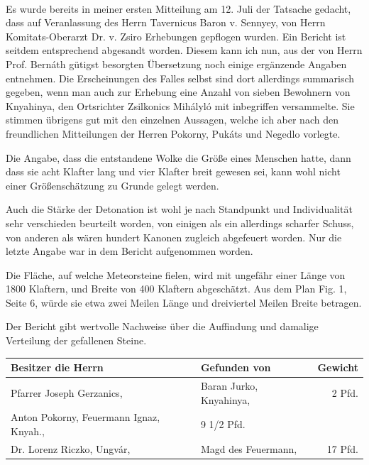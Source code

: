\documentclass[a4paper, 11pt, oneside, german]{article}
\begin{document}
\paragraph{}
Es wurde bereits in meiner ersten Mitteilung am 12. Juli der Tatsache gedacht, dass auf Veranlassung des Herrn Tavernicus Baron v. Sennyey, von Herrn Komitats-Oberarzt Dr. v. Zsiro Erhebungen gepflogen wurden. Ein Bericht ist seitdem entsprechend abgesandt worden. Diesem kann ich nun, aus der von Herrn Prof. Bernáth gütigst besorgten Übersetzung noch einige ergänzende Angaben entnehmen. Die Erscheinungen des Falles selbst sind dort allerdings summarisch gegeben, wenn man auch zur Erhebung eine Anzahl von sieben Bewohnern von Knyahinya, den Ortsrichter Zsilkonics Mihályló mit inbegriffen versammelte. Sie stimmen übrigens gut mit den einzelnen Aussagen, welche ich aber nach den freundlichen Mitteilungen der Herren Pokorny, Pukáts und Negedlo vorlegte.

Die Angabe, dass die entstandene Wolke die Größe eines Menschen hatte, dann dass sie acht Klafter lang und vier Klafter breit gewesen sei, kann wohl nicht einer Größenschätzung zu Grunde gelegt werden.

Auch die Stärke der Detonation ist wohl je nach Standpunkt und Individualität sehr verschieden beurteilt worden, von einigen als ein allerdings scharfer Schuss, von anderen als wären hundert Kanonen zugleich abgefeuert worden. Nur die letzte Angabe war in dem Bericht aufgenommen worden.

Die Fläche, auf welche Meteorsteine fielen, wird mit ungefähr einer Länge von 1800 Klaftern, und Breite von 400 Klaftern abgeschätzt. Aus dem Plan Fig. 1, Seite 6, würde sie etwa zwei Meilen Länge und dreiviertel Meilen Breite betragen.

Der Bericht gibt wertvolle Nachweise über die Auffindung und damalige Verteilung der gefallenen Steine.
\begin{table}[H]
    \centering\small
    \begin{tabular}{|l|l|r|}
    \hline
        \textbf{Besitzer die Herrn} & \textbf{Gefunden von} & \textbf{Gewicht} \\ \hline
        Pfarrer Joseph Gerzanics, & Baran Jurko, Knyahinya, & 2 Pfd. \\ \hline
        Anton Pokorny, Feuermann Ignaz, Knyah., & 9 1/2 Pfd. & ~ \\ \hline
        Dr. Lorenz Riczko, Ungvár, & Magd des Feuermann, & 17 Pfd. \\ \hline
    \end{tabular}
\end{table}
\end{document}
